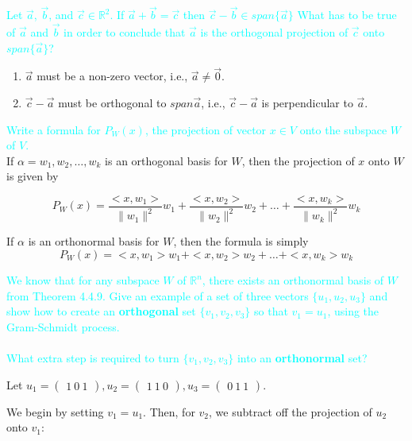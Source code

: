 \documentclass[fontsize=12pt]{scrartcl}
\begin{document}
\noindent
\textcolor{cyan}{Let $\vec{a}$, $\vec{b}$, and $\vec{c} \in \mathbb{R}^2$. If $\vec{a} + \vec{b} = \vec{c}$ then $\vec{c} - \vec{b} \in span\{\vec{a}\}$ What has to be true of $\vec{a}$ and $\vec{b}$ in order to conclude that $\vec{a}$ is the orthogonal projection of $\vec{c}$ onto $span\{\vec{a}\}$?}


\begin{enumerate}
	\item $\vec{a}$ must be a non-zero vector, i.e., $\vec{a} \neq \vec{0}$.
	\item $\vec{c} - \vec{a}$ must be orthogonal to $span{\vec{a}}$, i.e., $\vec{c} - \vec{a}$ is perpendicular to $\vec{a}$.
\end{enumerate}

\noindent
\textcolor{cyan}{Write a formula for $P_W(x)$, the projection of vector $x \in V$ onto the subspace $W$ of $V$.}\\

\noindent
If $\alpha={w_1,w_2,\ldots,w_k}$ is an orthogonal basis for $W$, then the projection of $x$ onto $W$ is given by

$$P_W(x) = \frac{<x, w_1>}{\| w_1 \|^2}w_1 + \frac{<x, w_2>}{\| w_2 \|^2}w_2 + \ldots + \frac{<x, w_k>}{\| w_k \|^2}w_k$$

\noindent
If $\alpha$ is an orthonormal basis for $W$, then the formula is simply
$$P_W(x) = <x, w_1>w_1 + <x, w_2>w_2 + \ldots + <x, w_k>w_k $$

\newpage

\noindent
\textcolor{cyan}{We know that for any subspace $W$ of $\mathbb{R}^n$, there exists an orthonormal basis of $W$ from Theorem 4.4.9. Give an example of a set of three vectors $\{ u_1, u_2, u_3\}$ and show how to create an \textbf{orthogonal} set $\{v_1, v_2, v_3\}$ so that $v_1 = u_1$, using the Gram-Schmidt process.}\\
\\
\textcolor{cyan}{What extra step is required to turn $\{v_1, v_2, v_3\}$ into an \textbf{orthonormal} set?}

\noindent
Let $u_1 = \begin{pmatrix} 1 \ 0 \ 1 \end{pmatrix}, u_2 = \begin{pmatrix} 1 \ 1 \ 0 \end{pmatrix}, u_3 = \begin{pmatrix} 0 \ 1 \ 1 \end{pmatrix}$.

\noindent
We begin by setting $v_1 = u_1$. Then, for $v_2$, we subtract off the projection of $u_2$ onto $v_1$:
\end{document}
